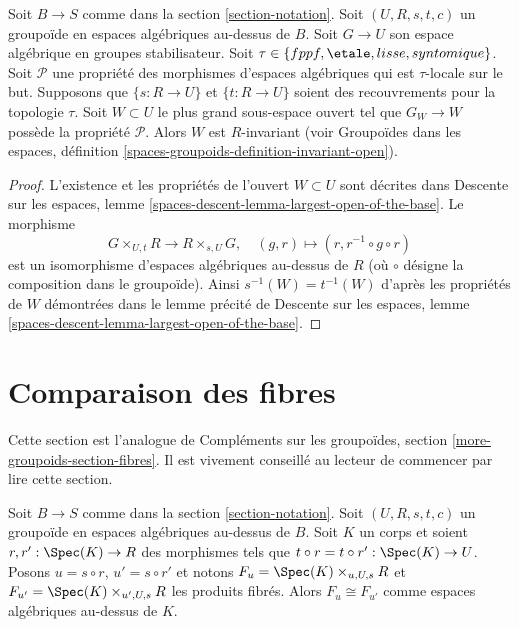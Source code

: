 \begin{lemma}
\label{lemma-property-G-invariant}
Soit $B \to S$ comme dans la section \ref{section-notation}.
Soit $(U, R, s, t, c)$ un groupoïde en espaces algébriques au-dessus de $B$.
Soit $G \to U$ son espace algébrique en groupes stabilisateur.
Soit
$\tau \in \{fppf, \linebreak[0] \etale, \linebreak[0]
lisse, \linebreak[0] syntomique\}$.
Soit $\mathcal{P}$ une propriété des morphismes d'espaces algébriques
qui est $\tau$-locale sur le but.
Supposons que $\{s : R \to U\}$ et $\{t : R \to U\}$ soient des recouvrements
pour la topologie $\tau$. Soit $W \subset U$ le plus grand sous-espace ouvert
tel que $G_W \to W$ possède la propriété $\mathcal{P}$.
Alors $W$ est $R$-invariant (voir
Groupoïdes dans les espaces,
définition \ref{spaces-groupoids-definition-invariant-open}).
\end{lemma}

\begin{proof}
L'existence et les propriétés de l'ouvert $W \subset U$ sont décrites dans
Descente sur les espaces, lemme \ref{spaces-descent-lemma-largest-open-of-the-base}.
Le morphisme
$$
G \times_{U, t} R \longrightarrow R \times_{s, U} G, \quad
(g, r) \longmapsto (r, r^{-1} \circ g \circ r)
$$
est un isomorphisme d'espaces algébriques au-dessus de $R$ (où $\circ$ désigne
la composition dans le groupoïde). Ainsi $s^{-1}(W)=t^{-1}(W)$ d'après les
propriétés de $W$ démontrées dans le lemme précité de
Descente sur les espaces, lemme \ref{spaces-descent-lemma-largest-open-of-the-base}.
\end{proof}




\section{Comparaison des fibres}
\label{section-fibres}

\noindent
Cette section est l'analogue de
Compléments sur les groupoïdes, section \ref{more-groupoids-section-fibres}.
Il est vivement conseillé au lecteur de commencer par lire cette section.

\begin{lemma}
\label{lemma-two-fibres}
Soit $B \to S$ comme dans la section \ref{section-notation}.
Soit $(U, R, s, t, c)$ un groupoïde en espaces algébriques au-dessus de $B$.
Soit $K$ un corps et soient $r, r' : \Spec(K) \to R$
des morphismes tels que $t \circ r = t \circ r' : \Spec(K) \to U$.
Posons $u = s \circ r$, $u' = s \circ r'$ et notons
$F_u = \Spec(K) \times_{u, U, s} R$ et
$F_{u'} = \Spec(K) \times_{u', U, s} R$ les produits fibrés.
Alors $F_u \cong F_{u'}$ comme espaces algébriques au-dessus de $K$.
\end{lemma}

